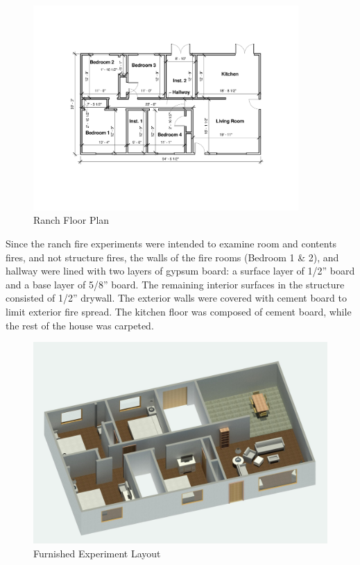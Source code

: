 \documentclass[12pt,oneside]{book}
\begin{document}
\begin{figure}[H]
\centering
\includegraphics[width=0.9\textwidth]{0_Images/Ranch_Pictures/Floor_Plan}
\caption{Ranch Floor Plan}
\label{figure:ranchexp1_floorplan}
\end{figure}

Since the ranch fire experiments were intended to examine room and contents fires, and not structure fires, the walls of the fire rooms (Bedroom 1 \& 2), and hallway were lined with two layers of gypsum board: a surface layer of 1/2'' board and a base layer of 5/8'' board. The remaining interior surfaces in the structure consisted of 1/2'' drywall. The exterior walls were covered with cement board to limit exterior fire spread. The kitchen floor was composed of cement board, while the rest of the house was carpeted. 

\begin{figure}[H]
\centering
\includegraphics[width=.65\textwidth]{0_Images/Ranch_Pictures/Report_ISO_Furniture.jpg}
\caption{Furnished Experiment Layout}
\label{figure:ranchexp3_floorplan}
\end{figure}
\end{document}
